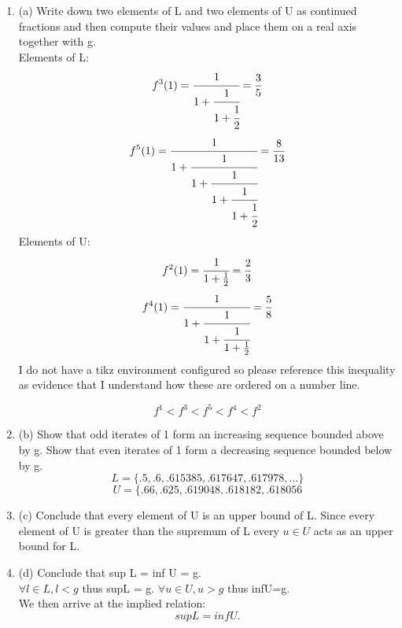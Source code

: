 \documentclass[11pt]{article}
\theoremstyle{definition}  %
\begin{document}
\begin{enumerate}
  \item (a) Write down two elements of L and two elements of U as continued
  fractions and then compute their values and place them on a real
  axis together with g.\\
  Elements of L:
  \[
    f^3(1)=\cfrac{1}{1+\cfrac{1}{1+\cfrac{1}{2}}}=\frac{3}{5}
  \]
  \[
    f^5(1)=\cfrac{1}{1+\cfrac{1}{1+\cfrac{1}{1+\cfrac{1}{1+\cfrac{1}{2}}}}}=\frac{8}{13}
  \]
  Elements of U:\[
    f^2(1)=\cfrac{1}{1+\frac{1}{2}}=\frac{2}{3}
  \]
  \[
    f^4(1)=\cfrac{1}{1+\cfrac{1}{1+\cfrac{1}{1+\frac{1}{2}}}}=\frac{5}{8}
  \]
  I do not have a tikz environment configured so please reference this inequality as evidence that I understand how these are ordered on a number line.

  \[
    f^1<f^3<f^5<f^4<f^2
  \]
  \item (b) Show that odd iterates of 1 form an increasing sequence bounded
  above by g. Show that even iterates of 1 form a decreasing sequence
  bounded below by g.\\
  \[
    L=\{.5,.6,.615385,.617647,.617978,...\}
  \]
  \[
    U=\{.66,.625,.619048,.618182,.618056
  \]
  \item (c) Conclude that every element of U is an upper bound of L.
  Since every element of U is greater than the supremum of L every $u\in U$ acts as an upper bound for L.
  \item (d) Conclude that sup L = inf U = g.\\
  $\forall l\in L, l <g$ thus supL = g.
  $\forall u\in U, u>g$ thus infU=g. \\
  We then arrive at the implied relation:
  \[
    supL=infU.
  \]
\end{enumerate}
\end{document}

